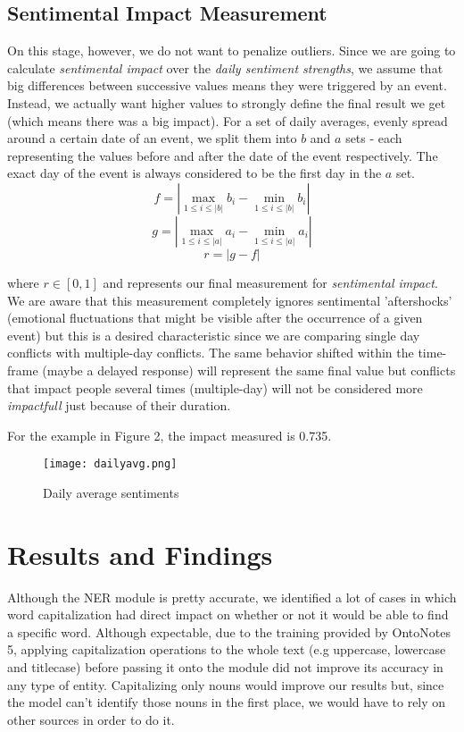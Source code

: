 \documentclass[11pt]{article}
\begin{document}
	\subsection{Sentimental Impact Measurement}
	\label{sub:sentimental_impact_measurement}
	On this stage, however, we do not want to penalize outliers. Since we are going to calculate \textit{sentimental impact} over the \textit{daily sentiment strengths}, we assume that big differences between successive values means they were triggered by an event. Instead, we actually want higher values to strongly define the final result we get (which means there was a big impact). 
	For a set of daily averages, evenly spread around a certain date of an event, we split them into $b$ and $a$ sets - each representing the values before and after the date of the event respectively. The exact day of the event is always considered to be the first day in the $a$ set.
	\begin{equation}
	f = |\max_{1 \leq i \leq |b|} b_{i} - \min_{1 \leq i \leq |b|} b_{i}|
	\end{equation}
	\begin{equation}
	g = |\max_{1 \leq i \leq |a|} a_{i} - \min_{1 \leq i \leq |a|} a_{i}|
	\end{equation}
	\begin{equation}
	r = |g - f|
	\end{equation}
	
	where $r \in [0, 1]$ and represents our final measurement for \textit{sentimental impact}. We are aware that this measurement completely ignores sentimental 'aftershocks' (emotional fluctuations that might be visible after the occurrence of a given event) but this is a desired characteristic since we are comparing single day conflicts with multiple-day conflicts. The same behavior shifted within the time-frame (maybe a delayed response) will represent the same final value but conflicts that impact people several times (multiple-day) will not be considered more \textit{impactfull} just because of their duration.

	For the example in Figure 2, the impact measured is 0.735.
	\begin{figure}[htp]
	    \centering
	    \texttt{[image: dailyavg.png]}
	    \caption{Daily average sentiments}
	\end{figure}

	\section{Results and Findings}
	Although the NER module is pretty accurate, we identified a lot of cases in which word capitalization had direct impact on whether or not it would be able to find a specific word. Although expectable, due to the training provided by OntoNotes 5, applying capitalization operations to the whole text (e.g uppercase, lowercase and titlecase) before passing it onto the module did not improve its accuracy in any type of entity. Capitalizing only nouns would improve our results but, since the model can't identify those nouns in the first place, we would have to rely on other sources in order to do it.
	
\end{document}
